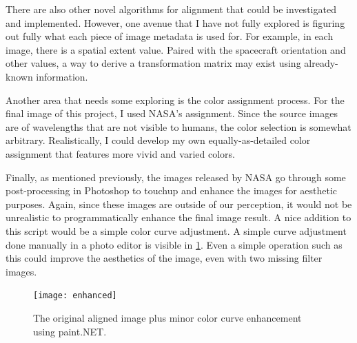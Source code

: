 \documentclass[10pt,twocolumn,letterpaper]{article}
\begin{document}
There are also other novel algorithms for alignment that could be investigated and implemented. However, one avenue that I have not fully explored is figuring out fully what each piece of image metadata is used for. For example, in each image, there is a spatial extent value. Paired with the spacecraft orientation and other values, a way to derive a transformation matrix may exist using already-known information.

Another area that needs some exploring is the color assignment process. For the final image of this project, I used NASA's assignment. Since the source images are of wavelengths that are not visible to humans, the color selection is somewhat arbitrary. Realistically, I could develop my own equally-as-detailed color assignment that features more vivid and varied colors.

Finally, as mentioned previously, the images released by NASA go through some post-processing in Photoshop to touchup and enhance the images for aesthetic purposes. Again, since these images are outside of our perception, it would not be unrealistic to programmatically enhance the final image result. A nice addition to this script would be a simple color curve adjustment. A simple curve adjustment done manually in a photo editor is visible in \cref{fig:enhancement}. Even a simple operation such as this could improve the aesthetics of the image, even with two missing filter images.

\begin{figure}[t]
  \centering
  \texttt{[image: enhanced]}
  \caption{The original aligned image plus minor color curve enhancement using paint.NET.}
  \label{fig:enhancement}
\end{figure}


\end{document}
